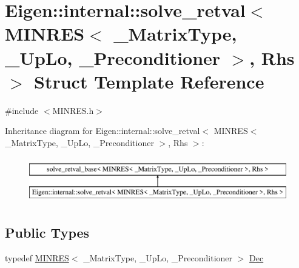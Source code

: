 \hypertarget{struct_eigen_1_1internal_1_1solve__retval_3_01_m_i_n_r_e_s_3_01___matrix_type_00_01___up_lo_00_033d2aeef68dae51d28c316c0d126c387}{}\section{Eigen\+:\+:internal\+:\+:solve\+\_\+retval$<$ M\+I\+N\+R\+E\+S$<$ \+\_\+\+Matrix\+Type, \+\_\+\+Up\+Lo, \+\_\+\+Preconditioner $>$, Rhs $>$ Struct Template Reference}
\label{struct_eigen_1_1internal_1_1solve__retval_3_01_m_i_n_r_e_s_3_01___matrix_type_00_01___up_lo_00_033d2aeef68dae51d28c316c0d126c387}


{\ttfamily \#include $<$M\+I\+N\+R\+E\+S.\+h$>$}

Inheritance diagram for Eigen\+:\+:internal\+:\+:solve\+\_\+retval$<$ M\+I\+N\+R\+E\+S$<$ \+\_\+\+Matrix\+Type, \+\_\+\+Up\+Lo, \+\_\+\+Preconditioner $>$, Rhs $>$\+:\begin{figure}[H]
\begin{center}
\leavevmode
\includegraphics[height=2.000000cm]{struct_eigen_1_1internal_1_1solve__retval_3_01_m_i_n_r_e_s_3_01___matrix_type_00_01___up_lo_00_033d2aeef68dae51d28c316c0d126c387}
\end{center}
\end{figure}
\subsection*{Public Types}
\begin{DoxyCompactItemize}
\item 
typedef \hyperlink{class_eigen_1_1_m_i_n_r_e_s}{M\+I\+N\+R\+E\+S}$<$ \+\_\+\+Matrix\+Type, \+\_\+\+Up\+Lo, \+\_\+\+Preconditioner $>$ \hyperlink{struct_eigen_1_1internal_1_1solve__retval_3_01_m_i_n_r_e_s_3_01___matrix_type_00_01___up_lo_00_033d2aeef68dae51d28c316c0d126c387_a3eec3b64852430c6fa2417ee707726f2}{Dec}
\end{DoxyCompactItemize}
